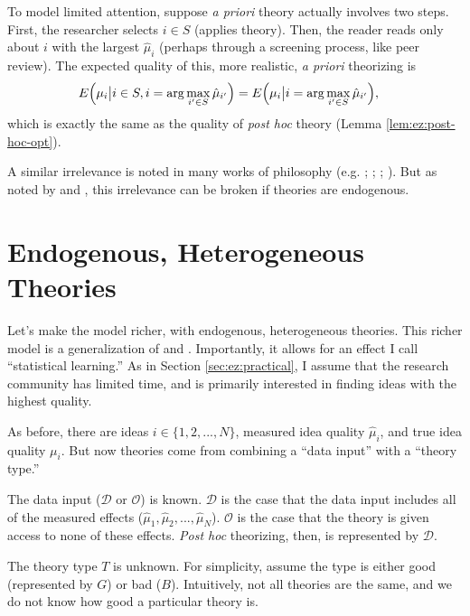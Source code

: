 \documentclass[12pt,english]{article}
\theoremstyle{plain}
\theoremstyle{plain}
\begin{document}
To model limited attention, suppose \emph{a priori} theory actually involves two steps. First, the researcher selects $i\in S $
(applies theory). Then, the reader reads only about $i$ with the largest $\hat{\mu}_{i}$ (perhaps through a screening process, like peer review). The expected quality of this, more realistic, \emph{a priori} theorizing is
\begin{align}
E\Bigl(\mu_{i}\big|i\in S ,i=\arg\max_{i'\in S }\hat{\mu}_{i'}\Bigr) 
& =
E\Bigl(\mu_{i}\big|i=\arg\max_{i'\in S }\hat{\mu}_{i'}\Bigr),
\end{align}
which is exactly the same as the quality of \emph{post hoc} theory (Lemma \ref{lem:ez:post-hoc-opt}).

A similar irrelevance is noted in many works of philosophy (e.g. \citet{hempel1966philosophy}; \citet{lakatos1970methodology}; \citet{rosenkrantz1977inference}; \citet{gardner1982predicting}).  But as noted by \citet{maher1988prediction} and \citet{kahn1996positive}, this irrelevance can be broken if theories are endogenous.

\section{Endogenous, Heterogeneous Theories}

Let's make the model richer, with endogenous, heterogeneous theories. This richer model is a generalization of \citet{maher1988prediction} and \citet{kahn1996positive}. Importantly, it allows for an effect I call ``statistical learning.'' As in Section \ref{sec:ez:practical}, I assume that the research community has limited time, and is primarily interested in finding ideas with the highest quality.

As before, there are ideas $i\in \{1,2,...,N\}$, measured idea quality $\hat{\mu}_{i}$, and true idea quality $\mu_{i}$. But now  theories come from combining a ``data input'' with a ``theory type.''  

The data input ($\mathcal{D}$ or $\mathcal{O}$) is  known. $\mathcal{D}$ is the case that the data input includes all of the measured effects ($\hat{\mu}_{1},\hat{\mu}_{2},...,\hat{\mu}_{N}$). $\mathcal{O}$ is the case that the theory is given access to none of these effects. \emph{Post hoc} theorizing, then, is represented by $\mathcal{D}$. 

The theory type $T$ is unknown. For simplicity, assume the type is either good (represented by $G$) or bad ($B$). Intuitively, not all theories are the same, and we do not know how good a particular theory is.
\end{document}
